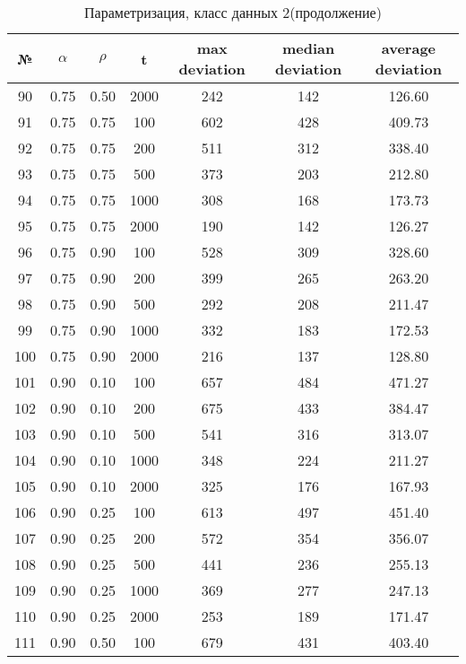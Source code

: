 \documentclass[a4paper, 12pt, unknownkeysallowed]{extreport}
\begin{document}
\begin{center}
  \captionsetup{justification=raggedright,singlelinecheck=off}
  \begin{longtable}[c]{|c|c|c|c|c|c|c|}
  \caption{Параметризация, класс данных 2(продолжение)\label{tbl:p_2_3}} \\ \hline
  № & $\alpha$ & $\rho$ & t & max deviation & median deviation & average deviation \\ \hline   
  90 & 0.75 & 0.50 &  2000 &  242 &  142 & 126.60 \\ \hline
  91 & 0.75 & 0.75 &   100 &  602 &  428 & 409.73 \\ \hline
  92 & 0.75 & 0.75 &   200 &  511 &  312 & 338.40 \\ \hline
  93 & 0.75 & 0.75 &   500 &  373 &  203 & 212.80 \\ \hline
  94 & 0.75 & 0.75 &  1000 &  308 &  168 & 173.73 \\ \hline
  95 & 0.75 & 0.75 &  2000 &  190 &  142 & 126.27 \\ \hline
  96 & 0.75 & 0.90 &   100 &  528 &  309 & 328.60 \\ \hline
  97 & 0.75 & 0.90 &   200 &  399 &  265 & 263.20 \\ \hline
  98 & 0.75 & 0.90 &   500 &  292 &  208 & 211.47 \\ \hline
  99 & 0.75 & 0.90 &  1000 &  332 &  183 & 172.53 \\ \hline
 100 & 0.75 & 0.90 &  2000 &  216 &  137 & 128.80 \\ \hline
 101 & 0.90 & 0.10 &   100 &  657 &  484 & 471.27 \\ \hline
 102 & 0.90 & 0.10 &   200 &  675 &  433 & 384.47 \\ \hline
 103 & 0.90 & 0.10 &   500 &  541 &  316 & 313.07 \\ \hline
 104 & 0.90 & 0.10 &  1000 &  348 &  224 & 211.27 \\ \hline
 105 & 0.90 & 0.10 &  2000 &  325 &  176 & 167.93 \\ \hline
 106 & 0.90 & 0.25 &   100 &  613 &  497 & 451.40 \\ \hline
 107 & 0.90 & 0.25 &   200 &  572 &  354 & 356.07 \\ \hline
 108 & 0.90 & 0.25 &   500 &  441 &  236 & 255.13 \\ \hline
 109 & 0.90 & 0.25 &  1000 &  369 &  277 & 247.13 \\ \hline
 110 & 0.90 & 0.25 &  2000 &  253 &  189 & 171.47 \\ \hline
 111 & 0.90 & 0.50 &   100 &  679 &  431 & 403.40 \\ \hline

\end{longtable}
\end{center}
\end{document}
